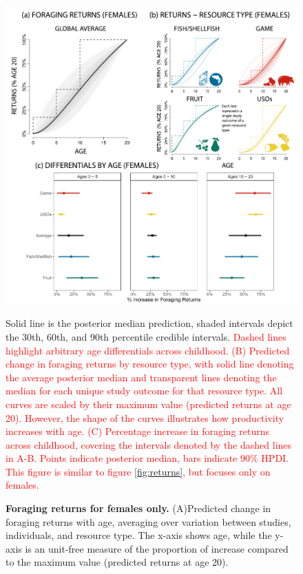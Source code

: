 \begin{figure}[h]
\centering
\includegraphics[width=12cm] {text/images/Figure_S3.pdf}
\renewcommand{\thefigure}{S\arabic{figure}}
\caption{\textbf{Foraging returns for females only.} (A)Predicted change in foraging returns with age, averaging over variation between studies, individuals, and resource type. The x-axis shows age, while the y-axis is an unit-free measure of the proportion of increase compared to the maximum value (predicted returns at age 20).} Solid line is the posterior median prediction, shaded intervals depict the 30th, 60th, and 90th percentile credible intervals. \textcolor{red}{Dashed lines highlight arbitrary age differentials across childhood. (B) Predicted change in foraging returns by resource type, with solid line denoting the average posterior median and transparent lines denoting the median for each unique study outcome for that resource type. All curves are scaled by their maximum value (predicted returns at age 20). However, the shape of the curves illustrates how productivity increases with age. (C) Percentage increase in foraging returns across childhood, covering the intervals denoted by the dashed lines in A-B. Points indicate posterior median, bars indicate 90\% HPDI. This figure is similar to figure \ref{fig:returns}, but focuses only on females.}
\label{fig:females_only}
\end{figure}

